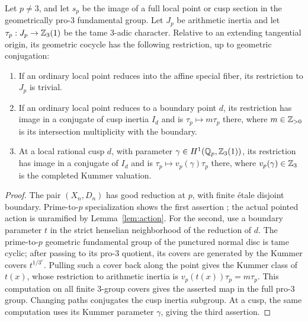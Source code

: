 \begin{lemma}
\label{lem:lm-local-inertia}
Let $p\ne3$, and let $s_p$ be the image of a full local point or cusp
section in the geometrically pro-$3$ fundamental group.  Let $J_p$ be
arithmetic inertia and let $\tau_p:J_p\to\mathbb Z_3(1)$ be the tame
$3$-adic character.  Relative to an extending tangential origin, its
geometric cocycle has the following restriction, up to geometric conjugation:
\begin{enumerate}
\item If an ordinary local point reduces into the affine special fiber,
its restriction to $J_p$ is trivial.
\item If an ordinary local point reduces to a boundary point $d$, its
restriction has image in a conjugate of cusp inertia $I_d$ and is
$\tau_p\mapsto m\tau_p$ there, where
$m\in\mathbb Z_{>0}$ is its intersection multiplicity with the boundary.
\item At a local rational cusp $d$, with parameter
$\gamma\in H^1(\mathbb Q_p,\mathbb Z_3(1))$, its restriction has image in a conjugate
of $I_d$ and is $\tau_p\mapsto v_p(\gamma)\tau_p$ there, where
$v_p(\gamma)\in\mathbb Z_3$ is the completed Kummer valuation.
\end{enumerate}
\end{lemma}
\begin{proof}
The pair $(X_n,D_n)$ has good reduction at $p$, with finite \'etale disjoint
boundary.  Prime-to-$p$ specialization shows the first assertion
\citep[Expos\'e XIII, \S2]{SGA1}; the actual pointed action is
unramified by Lemma~\ref{lem:action}.
For the second, use a boundary parameter $t$ in the strict henselian
neighborhood of the reduction of $d$.  The prime-to-$p$ geometric
fundamental group of the punctured normal disc is tame cyclic; after
passing to its pro-$3$ quotient, its covers are generated by the
Kummer covers $t^{1/3^r}$.  Pulling such a cover back along the point
gives the Kummer class of $t(x)$, whose restriction to arithmetic inertia
is $v_p(t(x))\tau_p=m\tau_p$.  This computation on all finite $3$-group
covers gives the asserted map in the full pro-$3$ group.  Changing paths
conjugates the cusp inertia subgroup.  At a cusp, the same computation
uses its Kummer parameter $\gamma$, giving the third assertion.
\end{proof}

